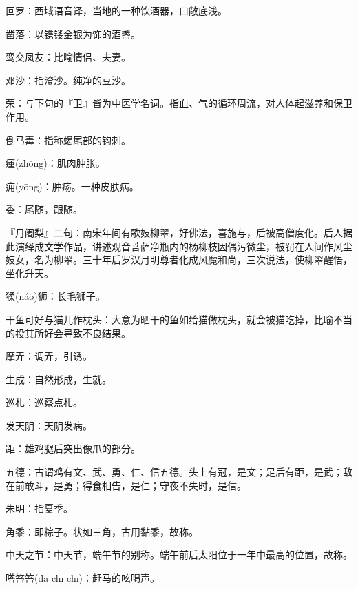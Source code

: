 \startbuffer[1678]
叵罗：西域语音译，当地的一种饮酒器，口敞底浅。
\stopbuffer


\startbuffer[1679]
凿落：以镌镂金银为饰的酒盏。
\stopbuffer


\startbuffer[1680]
鸾交凤友：比喻情侣、夫妻。
\stopbuffer


\startbuffer[1681]
邓沙：指澄沙。纯净的豆沙。
\stopbuffer


\startbuffer[1682]
荣：与下句的『卫』皆为中医学名词。指血、气的循环周流，对人体起滋养和保卫作用。
\stopbuffer


\startbuffer[1683]
倒马毒：指称蝎尾部的钩刺。
\stopbuffer


\startbuffer[1684]
瘇(zhǒng)：肌肉肿胀。
\stopbuffer


\startbuffer[1685]
痈(yōng)：肿疡。一种皮肤病。
\stopbuffer


\startbuffer[1686]
委：尾随，跟随。
\stopbuffer


\startbuffer[1687]
『月阇梨』二句：南宋年间有歌妓柳翠，好佛法，喜施与，后被高僧度化。后人据此演绎成文学作品，讲述观音菩萨净瓶内的杨柳枝因偶污微尘，被罚在人间作风尘妓女，名为柳翠。三十年后罗汉月明尊者化成风魔和尚，三次说法，使柳翠醒悟，坐化升天。
\stopbuffer


\startbuffer[1688]
猱(náo)狮：长毛狮子。
\stopbuffer


\startbuffer[1689]
干鱼可好与猫儿作枕头：大意为晒干的鱼如给猫做枕头，就会被猫吃掉，比喻不当的投其所好会导致不良结果。
\stopbuffer


\startbuffer[1690]
摩弄：调弄，引诱。
\stopbuffer


\startbuffer[1691]
生成：自然形成，生就。
\stopbuffer


\startbuffer[1692]
巡札：巡察点札。
\stopbuffer


\startbuffer[1693]
发天阴：天阴发病。
\stopbuffer


\startbuffer[1694]
距：雄鸡腿后突出像爪的部分。
\stopbuffer


\startbuffer[1695]
五德：古谓鸡有文、武、勇、仁、信五德。头上有冠，是文；足后有距，是武；敌在前敢斗，是勇；得食相告，是仁；守夜不失时，是信。
\stopbuffer


\startbuffer[1696]
朱明：指夏季。
\stopbuffer


\startbuffer[1697]
角黍：即粽子。状如三角，古用黏黍，故称。
\stopbuffer


\startbuffer[1698]
中天之节：中天节，端午节的别称。端午前后太阳位于一年中最高的位置，故称。
\stopbuffer


\startbuffer[1699]
嗒笞笞(dā chī chī)：赶马的吆喝声。
\stopbuffer


